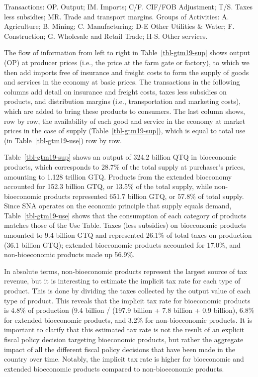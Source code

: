 \documentclass[
  letterpaper,
  DIV=11,
  numbers=noendperiod]{scrartcl}
\begin{document}
Transactions: OP. Output; IM. Imports; C/F. CIF/FOB Adjustment; T/S.
Taxes less subsidies; MR. Trade and transport margins. Groups of
Activities: A. Agriculture; B. Mining; C. Manufacturing; D-E Other
Utilities \& Water; F. Construction; G. Wholesale and Retail Trade; H-S.
Other services.

The flow of information from left to right in Table~\ref{tbl-gtm19-sup}
shows output (OP) at producer prices (i.e., the price at the farm gate
or factory), to which we then add imports free of insurance and freight
costs to form the supply of goods and services in the economy at basic
prices. The transactions in the following columns add detail on
insurance and freight costs, taxes less subsidies on products, and
distribution margins (i.e., transportation and marketing costs), which
are added to bring these products to consumers. The last column shows,
row by row, the availability of each good and service in the economy at
market prices in the case of supply (Table~\ref{tbl-gtm19-sup}), which
is equal to total use (in Table~\ref{tbl-gtm19-use}) row by row.

Table~\ref{tbl-gtm19-sup} shows an output of 324.2 billion QTQ in
bioeconomic products, which corresponds to 28.7\% of the total supply at
purchaser's prices, amounting to 1.128 trillion GTQ. Products from the
extended bioeconomy accounted for 152.3 billion GTQ, or 13.5\% of the
total supply, while non-bioeconomic products represented 651.7 billion
GTQ, or 57.8\% of total supply. Since SNA operates on the economic
principle that supply equals demand, Table~\ref{tbl-gtm19-use} shows
that the consumption of each category of products matches those of the
Use Table. Taxes (less subsidies) on bioeconomic products amounted to
9.4 billion GTQ and represented 26.1\% of total taxes on production
(36.1 billion GTQ); extended bioeconomic products accounted for 17.0\%,
and non-bioeconomic products made up 56.9\%.

In absolute terms, non-bioeconomic products represent the largest source
of tax revenue, but it is interesting to estimate the implicit tax rate
for each type of product. This is done by dividing the taxes collected
by the output value of each type of product. This reveals that the
implicit tax rate for bioeconomic products is 4.8\% of production (9.4
billion / (197.9 billion + 7.8 billion + 0.9 billion), 6.8\% for
extended bioeconomic products, and 3.2\% for non-bioeconomic products.
It is important to clarify that this estimated tax rate is not the
result of an explicit fiscal policy decision targeting bioeconomic
products, but rather the aggregate impact of all the different fiscal
policy decisions that have been made in the country over time. Notably,
the implicit tax rate is higher for bioeconomic and extended bioeconomic
products compared to non-bioeconomic products.
\end{document}

